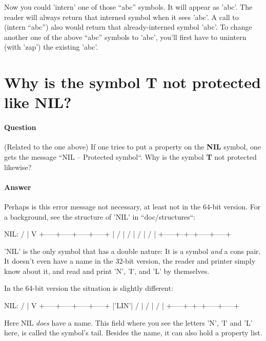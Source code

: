 Now you could 'intern' one of those ``abc'' symbols. It will appear as 'abc'. The
reader will always return that interned symbol when it sees 'abc'. A call to
(intern ``abc'') also would return that already-interned symbol 'abc'. To change
another one of the above ``abc'' symbols to 'abc', you'll first have to unintern
(with 'zap') the existing 'abc'.


\section{Why is the symbol \textbf{T} not protected like \textbf{NIL}?}
\label{sec:sfs}

\paragraph{Question}
\label{sec:dfs}

(Related to the one above) If one tries to put a property on the
\textbf{NIL} symbol, one gets the message ``NIL -- Protected symbol``.
Why is the symbol \textbf{T} not protected likewise?

\paragraph{Answer}
\label{sec:dfs}

Perhaps is this error message not necessary, at least not in the 64-bit version.
For a background, see the structure of 'NIL' in ``doc/structures``:

\begin{wideverbatim}
      NIL:  /
            |
            V
      +-----+-----+-----+-----+
      |  /  |  /  |  /  |  /  |
      +-----+--+--+-----+-----+
\end{wideverbatim}

'NIL' is the only symbol that has a double nature: It is a symbol \textit{and} a cons pair.
It doesn't even have a name in the 32-bit version, the reader and printer simply
know about it, and read and print 'N', 'I', and 'L' by themselves.

In the 64-bit version the situation is slightly different:
\begin{wideverbatim}
      NIL:  /
            |
            V
      +-----+-----+-----+-----+
      |'LIN'|  /  |  /  |  /  |
      +-----+--+--+-----+-----+
\end{wideverbatim}

Here NIL \textit{does} have a name. This field where you see the letters 'N', 'I' and
'L' here, is called the symbol's tail. Besides the name, it can also hold a
property list.

